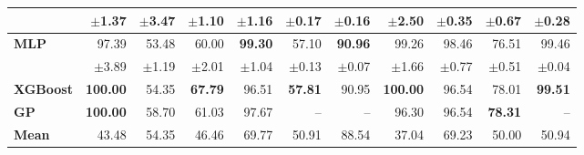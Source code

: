 \begin{table}[!htbp]
\begin{tabular}{lrrrrrrrrrr}
 & $\pm$1.37 & $\pm$3.47 & $\pm$1.10 & $\pm$1.16 & $\pm$0.17 & $\pm$0.16 & $\pm$2.50 & $\pm$0.35 & $\pm$0.67 & $\pm$0.28 \\
\midrule
\textbf{MLP} & 97.39 & 53.48 & 60.00 & \textbf{99.30} & 57.10 & \textbf{90.96} & 99.26 & 98.46 & 76.51 & 99.46 \\
 & $\pm$3.89 & $\pm$1.19 & $\pm$2.01 & $\pm$1.04 & $\pm$0.13 & $\pm$0.07 & $\pm$1.66 & $\pm$0.77 & $\pm$0.51 & $\pm$0.04 \\
\midrule
\textbf{XGBoost} & \textbf{100.00} & 54.35 & \textbf{67.79} & 96.51 & \textbf{57.81} & 90.95 & \textbf{100.00} & 96.54 & 78.01 & \textbf{99.51} \\
\midrule
\textbf{GP} & \textbf{100.00} & 58.70 & 61.03 & 97.67 & -- & -- & 96.30 & 96.54 & \textbf{78.31} & -- \\
\midrule
\textbf{Mean} & 43.48 & 54.35 & 46.46 & 69.77 & 50.91 & 88.54 & 37.04 & 69.23 & 50.00 & 50.94 \\
\bottomrule
\end{tabular}
\end{table}
